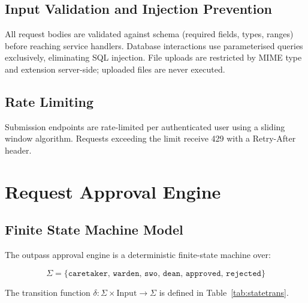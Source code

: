 \documentclass[12pt,a4paper]{report}
\begin{document}
\section{Input Validation and Injection Prevention}
All request bodies are validated against schema (required fields, types, ranges) before reaching service handlers. Database interactions use parameterised queries exclusively, eliminating SQL injection. File uploads are restricted by MIME type and extension server-side; uploaded files are never executed.

\section{Rate Limiting}
Submission endpoints are rate-limited per authenticated user using a sliding window algorithm. Requests exceeding the limit receive 429 with a Retry-After header.

\chapter{Request Approval Engine}

\section{Finite State Machine Model}

The outpass approval engine is a deterministic finite-state machine over:

\begin{equation}
  \Sigma = \{\texttt{caretaker},\, \texttt{warden},\, \texttt{swo},\, \texttt{dean},\, \texttt{approved},\, \texttt{rejected}\}
\end{equation}

The transition function $\delta: \Sigma \times \text{Input} \to \Sigma$ is defined in Table~\ref{tab:statetrans}.
\end{document}
